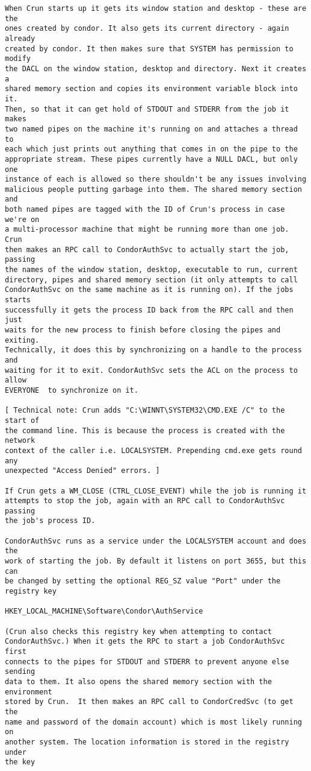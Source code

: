 \begin{verbatim}
When Crun starts up it gets its window station and desktop - these are the 
ones created by condor. It also gets its current directory - again already 
created by condor. It then makes sure that SYSTEM has permission to modify 
the DACL on the window station, desktop and directory. Next it creates a 
shared memory section and copies its environment variable block into it. 
Then, so that it can get hold of STDOUT and STDERR from the job it makes 
two named pipes on the machine it's running on and attaches a thread to 
each which just prints out anything that comes in on the pipe to the 
appropriate stream. These pipes currently have a NULL DACL, but only one 
instance of each is allowed so there shouldn't be any issues involving 
malicious people putting garbage into them. The shared memory section and 
both named pipes are tagged with the ID of Crun's process in case we're on 
a multi-processor machine that might be running more than one job. Crun 
then makes an RPC call to CondorAuthSvc to actually start the job, passing 
the names of the window station, desktop, executable to run, current 
directory, pipes and shared memory section (it only attempts to call 
CondorAuthSvc on the same machine as it is running on). If the jobs starts 
successfully it gets the process ID back from the RPC call and then just 
waits for the new process to finish before closing the pipes and exiting. 
Technically, it does this by synchronizing on a handle to the process and 
waiting for it to exit. CondorAuthSvc sets the ACL on the process to allow 
EVERYONE  to synchronize on it.

[ Technical note: Crun adds "C:\WINNT\SYSTEM32\CMD.EXE /C" to the start of 
the command line. This is because the process is created with the network 
context of the caller i.e. LOCALSYSTEM. Prepending cmd.exe gets round any 
unexpected "Access Denied" errors. ]

If Crun gets a WM_CLOSE (CTRL_CLOSE_EVENT) while the job is running it 
attempts to stop the job, again with an RPC call to CondorAuthSvc passing 
the job's process ID.

CondorAuthSvc runs as a service under the LOCALSYSTEM account and does the 
work of starting the job. By default it listens on port 3655, but this can 
be changed by setting the optional REG_SZ value "Port" under the registry key

HKEY_LOCAL_MACHINE\Software\Condor\AuthService

(Crun also checks this registry key when attempting to contact 
CondorAuthSvc.) When it gets the RPC to start a job CondorAuthSvc first 
connects to the pipes for STDOUT and STDERR to prevent anyone else sending 
data to them. It also opens the shared memory section with the environment 
stored by Crun.  It then makes an RPC call to CondorCredSvc (to get the 
name and password of the domain account) which is most likely running on 
another system. The location information is stored in the registry under 
the key


\end{verbatim}
